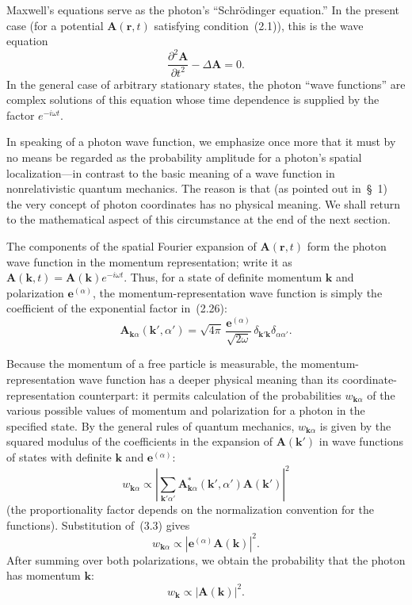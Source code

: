Maxwell's equations serve as the photon's ``Schrödinger equation.'' In the present case (for a potential $\mathbf{A}(\mathbf{r},t)$ satisfying condition~(2.1)), this is the wave equation
\[
\frac{\partial^2\mathbf A}{\partial t^2}-\Delta\mathbf A=0.
\]
In the general case of arbitrary stationary states, the photon ``wave functions'' are complex solutions of this equation whose time dependence is supplied by the factor $e^{-i\omega t}$.

In speaking of a photon wave function, we emphasize once more that it must by no means be regarded as the probability amplitude for a photon's  spatial localization---in contrast to the basic meaning of a wave function in nonrelativistic quantum mechanics. The reason is that (as pointed out in~\S~1) the very concept of photon coordinates has no physical meaning. We shall return to the mathematical aspect of this circumstance at the end of the next section.

The components of the spatial Fourier expansion of $\mathbf{A}(\mathbf{r},t)$ form the photon wave function in the momentum representation; write it as $\mathbf{A}(\mathbf{k},t)=\mathbf{A}(\mathbf{k})e^{-i\omega t}$. Thus, for a state of definite momentum $\mathbf{k}$ and polarization $\mathbf{e}^{(\alpha)}$, the momentum-representation wave function is simply the coefficient of the exponential factor in~(2.26):
\begin{equation}
\mathbf{A}_{\mathbf{k}\alpha}(\mathbf{k}',\alpha')
=\sqrt{4\pi}\,\frac{\mathbf{e}^{(\alpha)}}{\sqrt{2\omega}}\,
\delta_{\mathbf{k}'\mathbf{k}}\delta_{\alpha\alpha'}.
\tag{3.3}
\end{equation}

Because the momentum of a free particle is measurable, the momentum-representation wave function has a deeper physical meaning than its coordinate-representation counterpart: it permits calculation of the probabilities $w_{\mathbf{k}\alpha}$ of the various possible values of momentum and polarization for a photon in the specified state. By the general rules of quantum mechanics, $w_{\mathbf{k}\alpha}$ is given by the squared modulus of the coefficients in the expansion of $\mathbf{A}(\mathbf{k}')$ in wave functions of states with definite $\mathbf{k}$ and $\mathbf{e}^{(\alpha)}$:
\[
w_{\mathbf{k}\alpha}\propto
\left|\sum_{\mathbf{k}'\alpha'}
\mathbf{A}^*_{\mathbf{k}\alpha}(\mathbf{k}',\alpha')\mathbf{A}(\mathbf{k}')
\right|^2
\]
(the proportionality factor depends on the normalization convention for the functions). Substitution of~(3.3) gives
\begin{equation}
w_{\mathbf{k}\alpha}\propto
\left|\mathbf{e}^{(\alpha)}\mathbf{A}(\mathbf{k})\right|^2.
\tag{3.4}
\end{equation}
After summing over both polarizations, we obtain the probability that the photon has momentum $\mathbf{k}$:
\begin{equation}
w_{\mathbf{k}}\propto|\mathbf{A}(\mathbf{k})|^2.
\tag{3.5}
\end{equation}
